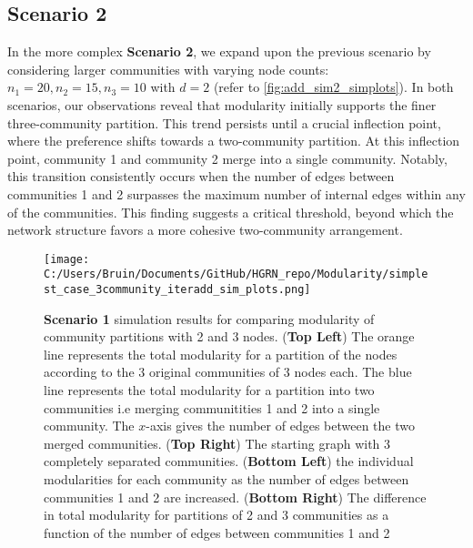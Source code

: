 \documentclass[a4paper,12pt]{article}
\begin{document}
	\subsection{Scenario 2}
	In the more complex \textbf{Scenario 2}, we expand upon the previous scenario by considering larger communities with varying node counts: $n_1 = 20, n_2 = 15, n_3 = 10$ with $d = 2$ (refer to \ref{fig:add_sim2_simplots}). In both scenarios, our observations reveal that modularity initially supports the finer three-community partition. This trend persists until a crucial inflection point, where the preference shifts towards a two-community partition. At this inflection point, community 1 and community 2 merge into a single community. Notably, this transition consistently occurs when the number of edges between communities 1 and 2 surpasses the maximum number of internal edges within any of the communities. This finding suggests a critical threshold, beyond which the network structure favors a more cohesive two-community arrangement.
	
	\begin{figure}[H]
		\caption{\textbf{Scenario 1} simulation results for comparing modularity of community partitions with 2 and 3 nodes. (\textbf{Top Left}) The orange line represents the total modularity for a partition of the nodes according to the 3 original communities of 3 nodes each. The blue line represents the total modularity for a partition into two communities i.e merging communitities 1 and 2 into a single community. The $x$-axis gives the number of edges between the two merged communities. (\textbf{Top Right}) The starting graph with 3 completely separated communities. (\textbf{Bottom Left}) the individual modularities for each community as the number of edges between communities 1 and 2 are increased. (\textbf{Bottom Right}) The difference in total modularity for partitions of 2 and 3 communities as a function of the number of edges between communities 1 and 2}
		\texttt{[image: C:/Users/Bruin/Documents/GitHub/HGRN\_repo/Modularity/simplest\_case\_3community\_iteradd\_sim\_plots.png]}
		\label{fig:add_case1_simplots}
	\end{figure}
	
\end{document}

